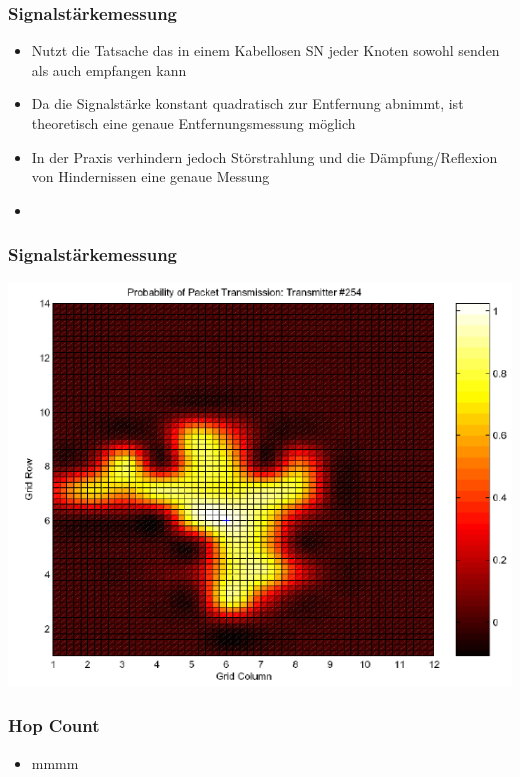 \begin{frame}
\frametitle{Signalstärkemessung}

\begin{itemize}
  \item Nutzt die Tatsache das in einem Kabellosen SN jeder Knoten sowohl senden als auch empfangen kann
  \item Da die Signalstärke konstant quadratisch zur Entfernung abnimmt, ist theoretisch eine genaue Entfernungsmessung möglich
  \item In der Praxis verhindern jedoch Störstrahlung und die Dämpfung/Reflexion von Hindernissen eine genaue Messung
  \item 
\end{itemize}
\end{frame}

\begin{frame}
\frametitle{Signalstärkemessung}
  \begin{center}
  \includegraphics[scale=0.5]{img/RSSI1}

  \end{center}
\end{frame}

\begin{frame}
\frametitle{Hop Count}

\begin{itemize}
  \item mmmm
\end{itemize}
\end{frame}

